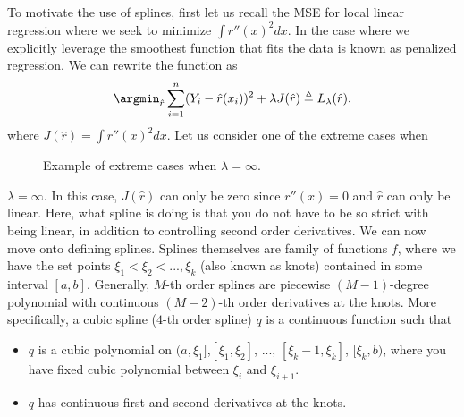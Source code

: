 To motivate the use of splines, first let us recall the MSE for local linear regression where we seek to minimize $\int r''(x)^2dx$. In the case where we explicitly leverage the smoothest function that fits the data is known as penalized regression. We can rewrite the function as
\[
\argmin_{\hat{r}} \sum_{i =1}^{n} (Y_i - \hat{r}(x_i))^2 + \lambda J(\hat{r}) \triangleq L_\lambda(\hat{r}).
\]
where $J(\hat{r}) = \int r''(x)^2dx$. Let us consider one of the extreme cases when
\begin{figure}[htbp!]
        \begin{center}
        \caption{Example of extreme cases when $\lambda = \infty$.}
        \label{fig:regression example}
        \end{center}
        \end{figure}
$\lambda = \infty$. In this case, $J(\hat{r})$ can only be zero since $r''(x) = 0$ and $\hat{r}$ can only be linear. Here, what spline is doing is that you do not have to be so strict with being linear, in addition to controlling second order derivatives. We can now move onto defining splines.
Splines themselves are family of functions $f$, where we have the set points $\xi_1 < \xi_2 < ... , \xi_k$ (also known as knots) contained in some interval $[a,b]$. Generally, $M$-th order splines are piecewise $(M-1)$-degree polynomial with continuous $(M-2)$-th order derivatives at the knots. More specifically, a cubic spline ($4$-th order spline) $q$ is a continuous function such that
\begin{itemize}
    \item $q$ is a cubic polynomial on $(a, \xi_1]$,$ [\xi_1, \xi_2]$, ..., $[\xi_k-1, \xi_k]$, $[\xi_k, b)$, where you have fixed cubic polynomial between $\xi_i$ and $\xi_{i+1}$. 
    \item $q$ has continuous first and second derivatives at the knots.
\end{itemize}

